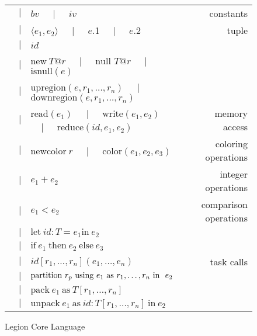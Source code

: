 \begin{figure*}
{\begin{tabular}{cclr}
  &$\mid$& $bv$ $\;\;\;\mid\;\;\;$ $iv$ & constants \\
  &$\mid$& $\langle e_1, e_2 \rangle$ $\;\;\;\mid\;\;\;$ $e$.1 $\;\;\;\mid\;\;\;$ $e$.2 & tuple \\
  &$\mid$& $id$ &  \\
  &$\mid$& $\text{new}\ T@r$ $\;\;\;\mid\;\;\;$ $\text{null }T@r$ $\;\;\;\mid\;\;\;$ $\text{isnull}(e)$ & \\
  &$\mid$& $\text{upregion}(e, r_1,\ldots,r_n)$ $\;\;\;\mid\;\;\;$ $\text{downregion}(e, r_1,\ldots,r_n)$ & \\
  &$\mid$& $\text{read}(e_1)$ $\;\;\;\mid\;\;\;$ $\text{write}(e_1, e_2)$ $\;\;\;\mid\;\;\;$ $\text{reduce}(id, e_1, e_2)$ & memory access \\
  &$\mid$& $\text{newcolor}\ r$ $\;\;\;\mid\;\;\;$ $\text{color}(e_1, e_2, e_3)$ & coloring operations \\
  &$\mid$& $e_1 + e_2$ & integer operations \\
  &$\mid$& $e_1 < e_2$ & comparison operations \\
  &$\mid$& $\text{let}\ id : T = e_1 \text{in}\ e_2$ &  \\
  &$\mid$& $\text{if}\ e_1\ \text{then}\ e_2\ \text{else}\ e_3$ &  \\
  &$\mid$& $id[r_1, \ldots, r_n](e_1,\ldots,e_n)$ & task calls \\
  &$\mid$& $\text{partition}\ r_p\text{ using }e_1\text{ as }{r}_1,\ldots,{r}_n\text{ in }\ e_2$ &  \\
  &$\mid$& $\text{pack}\ e_1\ \text{as}\ T[r_1,\ldots,r_n]$ &  \\
  &$\mid$& $\text{unpack}\ e_1\ \text{as}\ id : T[r_1,\ldots,r_n]\ \text{in}\ e_2$ &  \\

\end{tabular}
}
\caption{Legion Core Language}
\label{fig:langdef}
\end{figure*}

\newcommand{\cinfrule}[3]{\parbox{14cm}{\hfil$\infrule{#1}{#2}$\hfil}\parbox{4cm}{$\,#3$\hfil}}
\newcommand{\finfrule}[2]{\framebox{$\infrule{#1}{#2}$}}
\newcommand{\oldfinfrule}[2]{\vspace{10pt}\framebox{$\infrule{#1}{#2}$}\vspace{10pt}}

\newcommand{\infx}[2]{\infrule{\begin{array}{l}{#1}\end{array}}{#2}}

